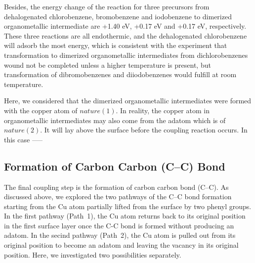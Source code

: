 \documentclass[%
 reprint,
 amsmath,amssymb,
 aps,
prb,
]{revtex4-2}
\begin{document}
Besides, the energy change of the reaction for three precursors from dehalogenated chlorobenzene, bromobenzene and iodobenzene to dimerized organometallic intermediate are +1.40 eV, +0.17 eV and +0.17 eV, respectively. These three reactions are all endothermic, and the dehalogenated chlorobenzene will adsorb the most energy, which is consistent with the experiment that transformation to dimerized organometallic intermediates from dichlorobenzenes wound not be completed unless a higher temperature is present, but transformation of dibromobenzenes and diiodobenzenes would fulfill at room temperature.

Here, we considered that the dimerized organometallic intermediates were formed with the copper atom of $nature(1)$. In reality, the copper atom in organometallic intermediates may also come from the adatom which is of $nature(2)$. It will lay above the surface before the coupling reaction occurs. In this case -----


\subsection{Formation of Carbon Carbon (C--C) Bond}

The final coupling step is the formation of carbon carbon bond (C--C). As discussed above, we explored the two pathways of the C--C bond formation starting from  the Cu atom partially lifted from the surface by two phenyl groups. In the first pathway (Path~1), the Cu atom returns back to its original position in the first surface layer once the C-C bond is formed without producing an adatom. In the secind pathway (Path~2), the Cu atom is pulled out from its original position to become an adatom and leaving the vacancy in its original position. %
Here, we investigated two possibilities separately.
\end{document}
